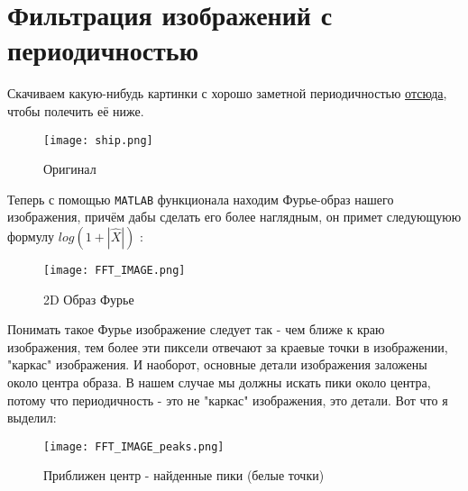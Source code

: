 \chapter{Фильтрация изображений с периодичностью}
\label{ch:chap1}



\lstset{style=mystyle}

Скачиваем какую-нибудь картинки с хорошо заметной периодичностью \href{https://drive.google.com/drive/folders/1oewu85taKvyxAUhXNH48ImTFtI1SpFag}{отсюда}, чтобы полечить её ниже.

\begin{figure}[ht]
    \centering
    \texttt{[image: ship.png]}
	\caption{Оригинал}
\end{figure}
Теперь с помощью \texttt{MATLAB} функционала находим Фурье-образ нашего изображения, причём дабы сделать его более наглядным, он примет следующуюю формулу $log(1 + |\hat{X}|)$ :

\begin{figure}[ht]
    \centering
    \texttt{[image: FFT\_IMAGE.png]}
	\caption{2D Образ Фурье}
\end{figure}
\newpage
Понимать такое Фурье изображение следует так - чем ближе к краю изображения, тем более эти пиксели отвечают за краевые точки в изображении, "каркас" изображения. И наоборот, основные детали изображения заложены около центра образа.
В нашем случае мы должны искать пики около центра, потому что периодичность - это не "каркас" изображения, это детали. Вот что я выделил:
\begin{figure}[ht]
    \centering
    \texttt{[image: FFT\_IMAGE\_peaks.png]}
	\caption{Приближен центр - найденные пики (белые точки) }
\end{figure}


